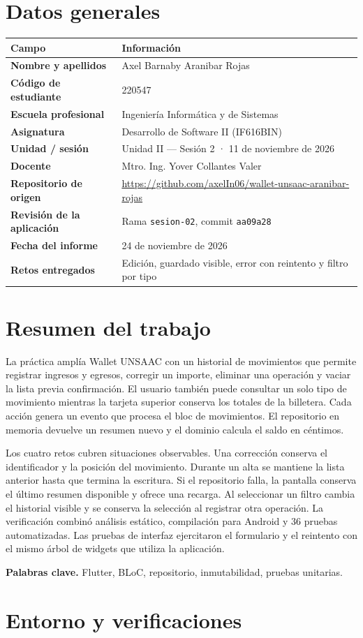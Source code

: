 \documentclass[11pt,letterpaper]{article}
\makeatletter
\renewcommand{\arraystretch}{1.28}
\newcommand{\tabla}[2]{\par\smallskip\begin{tabularx}{\linewidth}{@{}>{\bfseries\color{vino}}p{.28\linewidth}X@{}}\toprule\rowcolor{rosa}#1\\\midrule #2\bottomrule\end{tabularx}\par}
\makeatother
\begin{document}
\section{Datos generales}
\tabla{Campo & Información}{Nombre y apellidos & Axel Barnaby Aranibar Rojas\\Código de estudiante & 220547\\Escuela profesional & Ingeniería Informática y de Sistemas\\Asignatura & Desarrollo de Software II (IF616BIN)\\Unidad / sesión & Unidad II — Sesión 2 · 11 de noviembre de 2026\\Docente & Mtro. Ing. Yover Collantes Valer\\Repositorio de origen & \url{https://github.com/axelIn06/wallet-unsaac-aranibar-rojas}\\Revisión de la aplicación & Rama \texttt{sesion-02}, commit \texttt{aa09a28}\\Fecha del informe & 24 de noviembre de 2026\\Retos entregados & Edición, guardado visible, error con reintento y filtro por tipo\\}
\section{Resumen del trabajo}
La práctica amplía Wallet UNSAAC con un historial de movimientos que permite registrar ingresos y egresos, corregir un importe, eliminar una operación y vaciar la lista previa confirmación. El usuario también puede consultar un solo tipo de movimiento mientras la tarjeta superior conserva los totales de la billetera. Cada acción genera un evento que procesa el bloc de movimientos. El repositorio en memoria devuelve un resumen nuevo y el dominio calcula el saldo en céntimos.

Los cuatro retos cubren situaciones observables. Una corrección conserva el identificador y la posición del movimiento. Durante un alta se mantiene la lista anterior hasta que termina la escritura. Si el repositorio falla, la pantalla conserva el último resumen disponible y ofrece una recarga. Al seleccionar un filtro cambia el historial visible y se conserva la selección al registrar otra operación. La verificación combinó análisis estático, compilación para Android y 36 pruebas automatizadas. Las pruebas de interfaz ejercitaron el formulario y el reintento con el mismo árbol de widgets que utiliza la aplicación.

\textbf{Palabras clave.} Flutter, BLoC, repositorio, inmutabilidad, pruebas unitarias.
\newpage
\begingroup\small\renewcommand{\arraystretch}{1.13}\section{Entorno y verificaciones}
\end{document}
